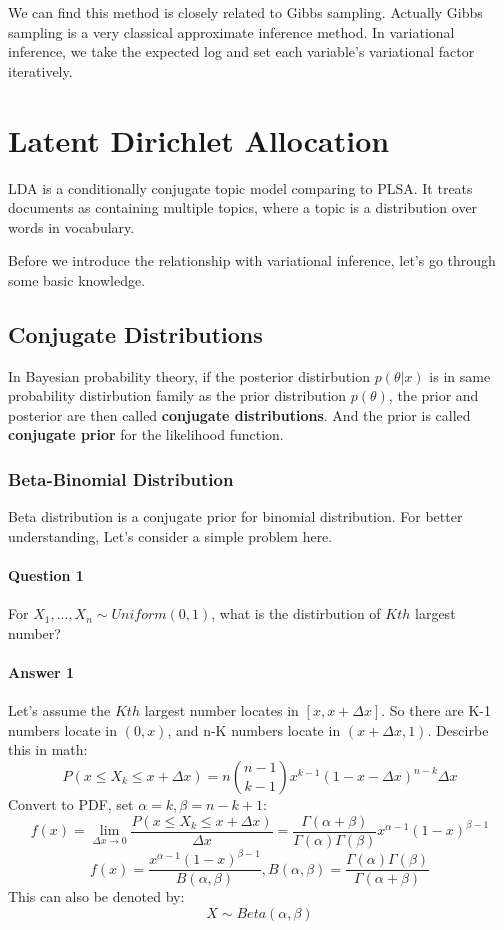 \documentclass{article}
\begin{document}
We can find this method is closely related to Gibbs sampling. Actually Gibbs sampling is a very classical approximate inference method. In variational inference,
we take the expected log and set each variable’s variational factor iteratively.
\section{Latent Dirichlet Allocation}
LDA is a conditionally conjugate topic model comparing to PLSA. It treats documents as containing multiple topics, where a topic is a distribution over words in vocabulary. 

Before we introduce the relationship with variational inference, let's go through some basic knowledge.
\subsection{Conjugate Distributions}
In Bayesian probability theory, if the posterior distirbution $p(\theta | x)$ is in same probability distirbution family as the prior distribution $p(\theta)$, the prior and posterior are then called \textbf{conjugate distributions}. And the prior is called \textbf{conjugate prior} for the likelihood function.

\subsubsection{Beta-Binomial Distribution}
Beta distribution is a conjugate prior for binomial distribution. For better understanding, Let's consider a simple problem here. 
\paragraph{Question 1} For $X_{1},...,X_{n} \sim Uniform(0,1)$, what is the distirbution of $Kth$ largest number? 
\paragraph{Answer 1} Let's assume the $Kth$ largest number locates in $[x,x+\Delta x]$. So there are K-1 numbers locate in $(0,x)$, and n-K numbers locate in $(x+\Delta x,1)$. Descirbe this in math: 
$$P(x \leq X_{k} \leq x+\Delta x)=n \binom {n-1} {k-1} x^{k-1}(1-x-\Delta x)^{n-k}\Delta x$$
Convert to PDF, set $\alpha=k, \beta=n-k+1$:
$$f(x)= \lim_{\Delta x \rightarrow 0} \frac{P(x \leq X_{k} \leq x+\Delta x)}{\Delta x} =\frac{\Gamma(\alpha+\beta)}{\Gamma(\alpha)\Gamma(\beta)}x^{\alpha-1}(1-x)^{\beta-1} $$
$$f(x)=\frac{x^{\alpha-1}(1-x)^{\beta-1}}{B(\alpha,\beta)}, B(\alpha,\beta)=\frac{\Gamma(\alpha)\Gamma(\beta)}{\Gamma(\alpha+\beta)}$$
This can also be denoted by:
$$X \sim Beta(\alpha,\beta)$$
\end{document}
